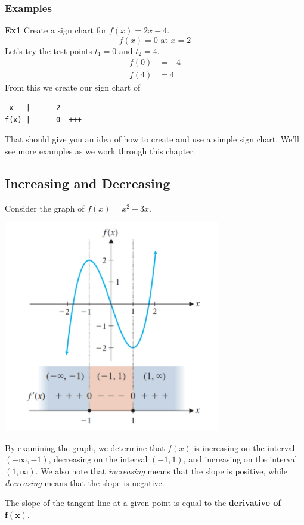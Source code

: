 \documentclass[14pt]{extarticle}
\begin{document}
\subsubsection{Examples}
\textbf{Ex1}
Create a sign chart for $f(x)= 2x-4$. $$f(x) = 0 \text{ at } x=2$$
Let's try the test points $t_1=0$ and $t_2=4$.
\begin{align*}
	f(0) &= -4 \\
	f(4) &= 4
\end{align*}
From this we create our sign chart of
\begin{verbatim}
 x   |      2      
f(x) | ---  0  +++
\end{verbatim}

That should give you an idea of how to create and use a simple sign chart. We'll see more examples as we work through this chapter.


\subsection{Increasing and Decreasing}
Consider the graph of $f(x)=x^2-3x$.

\begin{center}\includegraphics[width=0.55\linewidth]{11-1-a1}\end{center}

By examining the graph, we determine that $f(x)$ is increasing on the interval $(-\infty, -1)$, decreasing on the interval $(-1,1)$, and increasing on the interval $(1, \infty)$. We also note that \textit{increasing} means that the slope is positive, while \textit{decreasing} means that the slope is negative.

The slope of the tangent line at a given point is equal to the \textbf{derivative of} $\mathbf{f(x)}$.
\end{document}
